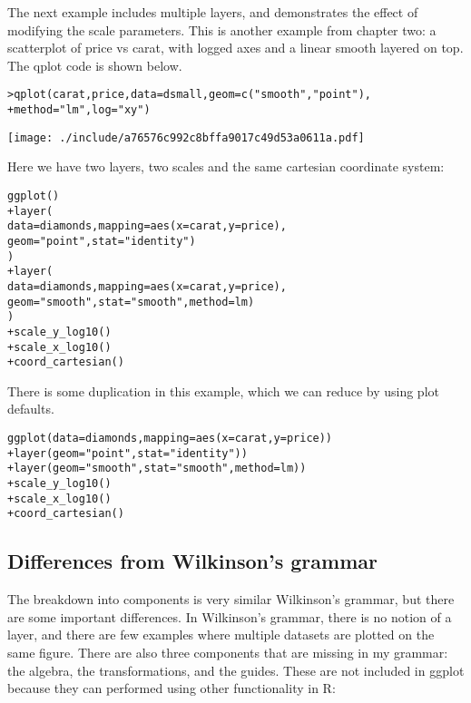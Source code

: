 The next example includes multiple layers, and demonstrates the effect of modifying the scale parameters.  This is another example from chapter two: a scatterplot of price vs carat, with logged axes and a linear smooth layered on top.  The qplot code is shown below.

\begin{alltt}
> qplot(carat, price, data = dsmall, geom = c("smooth", "point"), 
+     method = "lm", log = "xy")
\end{alltt}
\texttt{[image: ./include/a76576c992c8bffa9017c49d53a0611a.pdf]}
\begin{alltt}

\end{alltt}

Here we have two layers, two scales and the same cartesian coordinate system:

\begin{alltt}
ggplot() 
+ layer(
   data = diamonds, mapping = aes(x = carat, y = price),
   geom = "point", stat = "identity")
  )
+ layer(
   data = diamonds, mapping = aes(x = carat, y = price),
   geom = "smooth", stat = "smooth", method = lm)
  )
+ scale_y_log10()
+ scale_x_log10()
+ coord_cartesian()
\end{alltt}

There is some duplication in this example, which we can reduce by using plot defaults.

\begin{alltt}
ggplot(data = diamonds, mapping = aes(x = carat, y = price)) 
+ layer(geom = "point", stat = "identity"))
+ layer(geom = "smooth", stat = "smooth", method = lm))
+ scale_y_log10()
+ scale_x_log10()
+ coord_cartesian()
\end{alltt}

\subsection{Differences from Wilkinson's grammar}

The breakdown into components is very similar Wilkinson's grammar, but there are some important differences.  In Wilkinson's grammar, there is no notion of a layer, and there are few examples where multiple datasets are plotted on the same figure.  There are also three components that are missing in my grammar: the algebra, the transformations, and the guides.  These are not included in ggplot because they can performed using other functionality in R:

